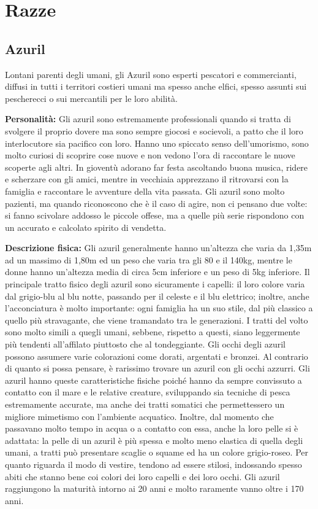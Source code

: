 \documentclass[a4paper]{report}
\begin{document}
\chapter{Razze}
\begin{multicols}{2}
\section{Azuril}
Lontani parenti degli umani, gli Azuril sono esperti pescatori e commercianti, diffusi in tutti i territori costieri umani ma spesso anche elfici, spesso assunti sui pescherecci o sui mercantili per le loro abilità.

\textbf{Personalità:} Gli azuril sono estremamente professionali quando si tratta di svolgere il proprio dovere ma sono sempre giocosi e socievoli, a patto che il loro interlocutore sia pacifico con loro. Hanno uno spiccato senso dell’umorismo, sono molto curiosi di scoprire cose nuove e non vedono l’ora di raccontare le nuove scoperte agli altri. In gioventù adorano far festa ascoltando buona musica, ridere e scherzare con gli amici, mentre in vecchiaia apprezzano il ritrovarsi con la famiglia e raccontare le avventure della vita passata. Gli azuril sono molto pazienti, ma quando riconoscono che è il caso di agire, non ci pensano due volte: si fanno scivolare addosso le piccole offese, ma a quelle più serie rispondono con un accurato e calcolato spirito di vendetta.

\textbf{Descrizione fisica:} Gli azuril generalmente hanno un’altezza che varia da 1,35m ad un massimo di 1,80m ed un peso che varia tra gli 80 e il 140kg, mentre le donne hanno un’altezza media di circa 5cm inferiore e un peso di 5kg inferiore. Il principale tratto fisico degli azuril sono sicuramente i capelli: il loro colore varia dal grigio-blu al blu notte, passando per il celeste e il blu elettrico; inoltre, anche l’acconciatura è molto importante: ogni famiglia ha un suo stile, dal più classico a quello più stravagante, che viene tramandato tra le generazioni. I tratti del volto sono molto simili a quegli umani, sebbene, rispetto a questi, siano leggermente più tendenti all’affilato piuttosto che al tondeggiante. Gli occhi degli azuril possono assumere varie colorazioni come dorati, argentati e bronzei. Al contrario di quanto si possa pensare, è rarissimo trovare un azuril con gli occhi azzurri. Gli azuril hanno queste caratteristiche fisiche poiché hanno da sempre convissuto a contatto con il mare e le relative creature, sviluppando sia tecniche di pesca estremamente accurate, ma anche dei tratti somatici che permettessero un migliore mimetismo con l’ambiente acquatico. Inoltre, dal momento che passavano molto tempo in acqua o a contatto con essa, anche la loro pelle si è adattata: la pelle di un azuril è più spessa e molto meno elastica di quella degli umani, a tratti può presentare scaglie o squame ed ha un colore grigio-roseo.  Per quanto riguarda il modo di vestire, tendono ad essere stilosi, indossando spesso abiti che stanno bene coi colori dei loro capelli e dei loro occhi. Gli azuril raggiungono la maturità intorno ai 20 anni e molto raramente vanno oltre i 170 anni.



\end{multicols}
\end{document}
